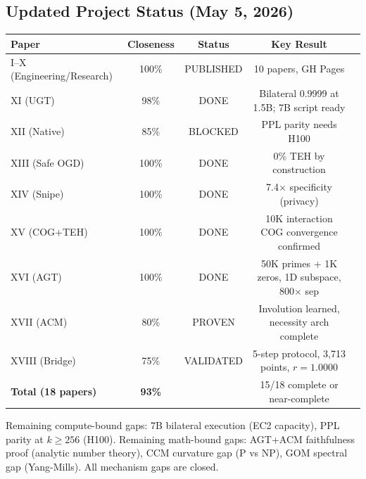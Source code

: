 \documentclass[11pt]{article}
\begin{document}
\subsection*{Updated Project Status (May 5, 2026)}

\begin{center}
\begin{tabular}{lcccl}
\toprule
\textbf{Paper} & \textbf{Closeness} & \textbf{Status} & \textbf{Key Result} \\
\midrule
I--X (Engineering/Research) & 100\% & PUBLISHED & 10 papers, GH Pages \\
XI (UGT) & 98\% & DONE & Bilateral 0.9999 at 1.5B; 7B script ready \\
XII (Native) & 85\% & BLOCKED & PPL parity needs H100 \\
XIII (Safe OGD) & 100\% & DONE & 0\% TEH by construction \\
XIV (Snipe) & 100\% & DONE & 7.4$\times$ specificity (privacy) \\
XV (COG+TEH) & 100\% & DONE & 10K interaction COG convergence confirmed \\
XVI (AGT) & 100\% & DONE & 50K primes + 1K zeros, 1D subspace, 800$\times$ sep \\
XVII (ACM) & 80\% & PROVEN & Involution learned, necessity arch complete \\
XVIII (Bridge) & 75\% & VALIDATED & 5-step protocol, 3,713 points, $r=1.0000$ \\
\midrule
\textbf{Total (18 papers)} & \textbf{93\%} & & 15/18 complete or near-complete \\
\bottomrule
\end{tabular}
\end{center}

Remaining compute-bound gaps: 7B bilateral execution (EC2 capacity), PPL parity at $k\ge 256$ (H100). Remaining math-bound gaps: AGT+ACM faithfulness proof (analytic number theory), CCM curvature gap (P vs NP), GOM spectral gap (Yang-Mills). All mechanism gaps are closed.
\end{document}
